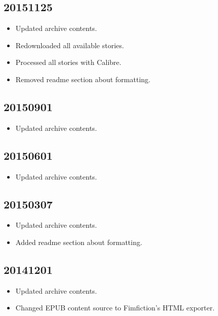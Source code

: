 \documentclass[hidelinks,a4paper,12pt]{article}
\begin{document}
\subsection{20151125}  \label{sec:changelog_20151125}

\begin{itemize}
\item Updated archive contents.
\item Redownloaded all available stories.
\item Processed all stories with Calibre.
\item Removed readme section about formatting.
\end{itemize}

\subsection{20150901}  \label{sec:changelog_20150901}

\begin{itemize}
\item Updated archive contents.
\end{itemize}

\subsection{20150601}  \label{sec:changelog_20150601}

\begin{itemize}
\item Updated archive contents.
\end{itemize}

\subsection{20150307}  \label{sec:changelog_20150307}

\begin{itemize}
\item Updated archive contents.
\item Added readme section about formatting.
\end{itemize}

\subsection{20141201} \label{sec:changelog_20141201}

\begin{itemize}
\item Updated archive contents.
\item Changed EPUB content source to Fimfiction's HTML exporter.
\end{itemize}
\end{document}
